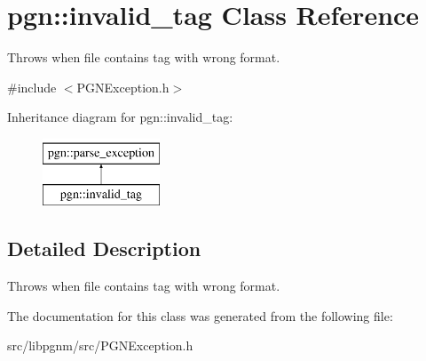 \hypertarget{classpgn_1_1invalid__tag}{
\section{pgn::invalid\_\-tag Class Reference}
\label{classpgn_1_1invalid__tag}
}


Throws when file contains tag with wrong format.  




{\ttfamily \#include $<$PGNException.h$>$}

Inheritance diagram for pgn::invalid\_\-tag:\begin{figure}[H]
\begin{center}
\leavevmode
\includegraphics[height=2.000000cm]{classpgn_1_1invalid__tag}
\end{center}
\end{figure}


\subsection{Detailed Description}
Throws when file contains tag with wrong format. 

The documentation for this class was generated from the following file:\begin{DoxyCompactItemize}
\item 
src/libpgnm/src/PGNException.h\end{DoxyCompactItemize}
